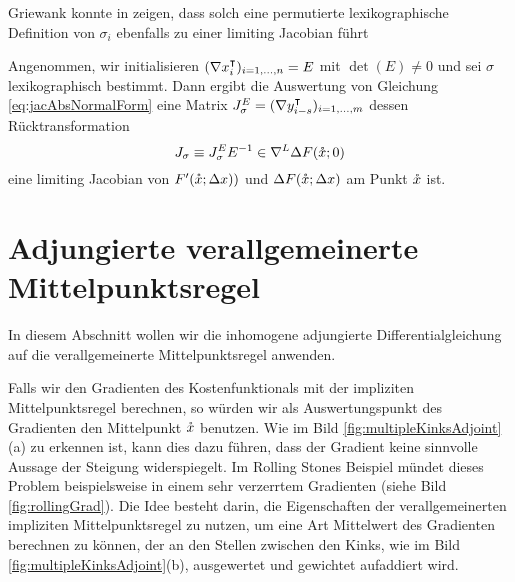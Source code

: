 Griewank konnte in \cite[Prop.8]{monster} zeigen, dass solch eine permutierte lexikographische Definition von $\sigma_i$ ebenfalls zu einer limiting Jacobian führt
\begin{theorem}
Angenommen, wir initialisieren $(\nabla x_i^\intercal)_{i=1,\ldots,n} = E$ mit $\det(E)\neq 0$ und sei $\sigma$ lexikographisch bestimmt. Dann ergibt die Auswertung von Gleichung \eqref{eq:jacAbsNormalForm} eine Matrix $J_\sigma^E = (\nabla y_{i-s}^\intercal)_{i=1,\ldots,m}$ dessen Rücktransformation
\[
 J_\sigma \equiv J_\sigma^E E^{-1} \in \nabla^L \Delta F(\mathring{x};0) 
\]
eine limiting Jacobian von $F'(\mathring{x};\Delta x))$ und $\Delta F(\mathring{x};\Delta x)$ am Punkt $\mathring{x}$ ist.
\end{theorem}
\section{Adjungierte verallgemeinerte Mittelpunktsregel}

In diesem Abschnitt wollen wir die inhomogene adjungierte Differentialgleichung auf die verallgemeinerte Mittelpunktsregel anwenden.

Falls wir den Gradienten des Kostenfunktionals mit der impliziten Mittelpunktsregel berechnen, so würden wir als Auswertungspunkt des Gradienten den Mittelpunkt $\mathring{x}$ benutzen. Wie im Bild \ref{fig:multipleKinksAdjoint}(a) zu erkennen ist, kann dies dazu führen, dass der Gradient keine sinnvolle Aussage der Steigung widerspiegelt. Im Rolling Stones Beispiel mündet dieses Problem beispielsweise in einem sehr verzerrtem Gradienten (siehe Bild \ref{fig:rollingGrad}). Die Idee besteht darin, die Eigenschaften der verallgemeinerten impliziten Mittelpunktsregel zu nutzen, um eine Art Mittelwert des Gradienten berechnen zu können, der an den Stellen zwischen den Kinks, wie im Bild \ref{fig:multipleKinksAdjoint}(b), ausgewertet und gewichtet aufaddiert wird. 

